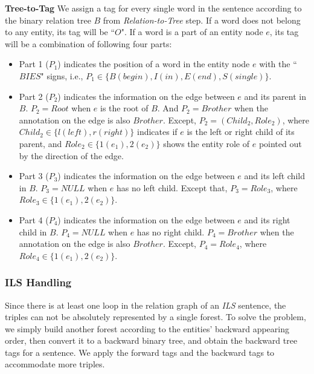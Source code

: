 \documentclass[conference]{IEEEtran}
\begin{document}
\textbf{Tree-to-Tag} We assign a tag for every single word in the sentence according to the binary relation tree $B$ from \emph{Relation-to-Tree} step. If a word does not belong to any entity, its tag will be ``$O$". If a word is a part of an entity node $e$, its tag will be a combination of following four parts:
\begin{itemize}
	\item Part 1 ($P_1$) indicates the position of a word in the entity node $e$ with the 
    ``$BIES$" signs, i.e., $P_1 \in \{B(begin), I(in), E(end), S(single)\}$.

	\item Part 2 ($P_2$) indicates the information on the edge between $e$ and its parent in 
    $B$. $P_2 = Root$ when $e$ is the root of $B$. And $P_2 = Brother$ when the annotation on 
    the edge is also $Brother$. Except, $P_2 = (Child_2, Role_2)$, where 
    $Child_2 \in \{l(left), r(right)\}$ indicates if $e$ is the left or right child of its 
    parent, and $Role_2 \in \{1(e_1), 2(e_2)\}$ shows the entity role of $e$ pointed out by 
    the direction of the edge.

	\item Part 3 ($P_3$) indicates the information on the edge between $e$ and its left child 
    in $B$. $P_3 = NULL$ when $e$ has no left child. Except that, $P_3 = Role_3$, where 
    $Role_3 \in \{1(e_1), 2(e_2)\}$.

	\item Part 4 ($P_4$) indicates the information on the edge between $e$ and its right child 
    in $B$. $P_4 = NULL$ when $e$ has no right child. $P_4 = Brother$ when the annotation on 
    the edge is also $Brother$. Except, $P_4 = Role_4$, where $Role_4 \in \{1(e_1), 2(e_2)\}$.
\end{itemize}

\subsubsection{ILS Handling}
Since there is at least one loop in the relation graph of an \emph{ILS} sentence, the triples can not be absolutely represented by a single forest. To solve the problem, we simply build another forest according to the entities' backward appearing order, then convert it to a backward binary tree, and obtain the backward tree tags for a sentence. We apply the forward tags and the backward tags to accommodate more triples.
\end{document}
